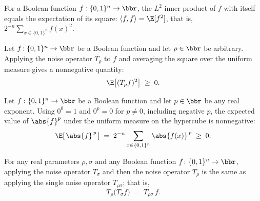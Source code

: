 \begin{lemma}
\label{BooleanAnalysis.Hypercontractivity.innerProduct_eq_expect_sq}
\leanok
{}
For a Boolean function $f : \{0,1\}^n \to \bbr$, the $L^2$ inner product of $f$ with
itself equals the expectation of its square: $\langle f, f\rangle = \E[f^2]$, that is,
$2^{-n}\sum_{x \in \{0,1\}^n} f(x)^2$.
\end{lemma}

\begin{lemma}
\label{BooleanAnalysis.Hypercontractivity.expect_sq_noiseOp_nonneg}
\leanok
{}
Let $f\colon\{0,1\}^n\to\bbr$ be a Boolean function and let $\rho\in\bbr$ be arbitrary.
Applying the noise operator $T_\rho$ to $f$ and averaging the square over the uniform
measure gives a nonnegative quantity:
\[
  \E\!\left[(T_\rho f)^2\right]\;\ge\;0.
\]
\end{lemma}

\begin{lemma}
\label{BooleanAnalysis.Hypercontractivity.expect_rpow_abs_nonneg}
\leanok
{}
Let $f:\{0,1\}^n\to\bbr$ be a Boolean function and let $p\in\bbr$ be any real exponent.
Using $0^0=1$ and $0^p=0$ for $p\ne0$, including negative $p$,
the expected value of $\abs{f}^p$ under the uniform measure on the hypercube is
nonnegative:
\[
\E\!\left[\,\abs{f}^{\,p}\,\right]\;=\;2^{-n}\sum_{x\in\{0,1\}^n}\abs{f(x)}^{\,p}\;\ge\;0.
\]
\end{lemma}

\begin{lemma}
\label{BooleanAnalysis.Hypercontractivity.noiseOp_compose}
\leanok
{}
For any real parameters $\rho,\sigma$ and any Boolean function
$f\colon\{0,1\}^n\to\bbr$, applying the noise operator $T_\sigma$ and then the noise
operator $T_\rho$ is the same as applying the single noise operator $T_{\rho\sigma}$;
that is,
\[
  T_\rho\bigl(T_\sigma f\bigr) \;=\; T_{\rho\sigma}\,f .
\]
\end{lemma}

